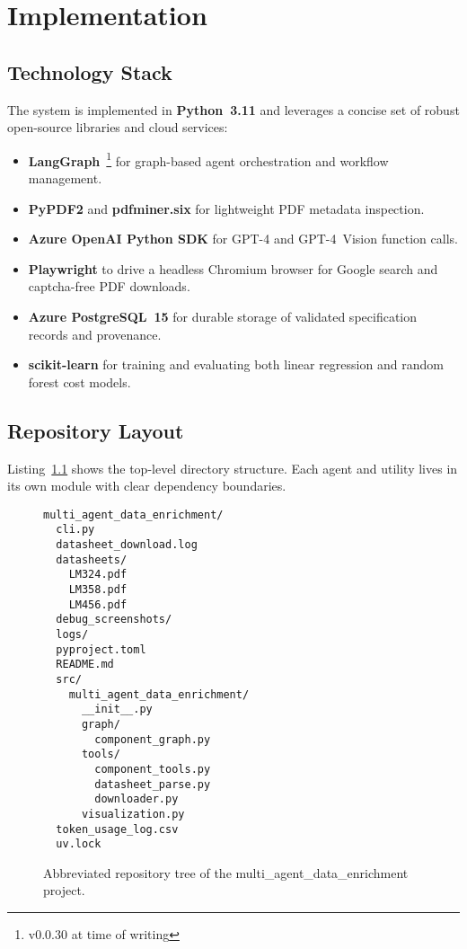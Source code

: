 \chapter{Implementation}
\label{chapter:implementation}

\section{Technology Stack}
The system is implemented in \textbf{Python~3.11} and leverages a concise set of robust open-source libraries and cloud services:
\begin{itemize}
  \item \textbf{LangGraph}~\footnote{v0.0.30 at time of writing} for graph-based agent orchestration and workflow management.
  \item \textbf{PyPDF2} and \textbf{pdfminer.six} for lightweight PDF metadata inspection.
  \item \textbf{Azure OpenAI Python SDK} for GPT-4 and GPT-4~Vision function calls.
  \item \textbf{Playwright} to drive a headless Chromium browser for Google search and captcha-free PDF downloads.
  \item \textbf{Azure PostgreSQL~15} for durable storage of validated specification records and provenance.
  \item \textbf{scikit-learn} for training and evaluating both linear regression and random forest cost models.
\end{itemize}

\section{Repository Layout}
Listing~\ref{lst:tree} shows the top-level directory structure.  Each agent and utility lives in its own module with clear dependency boundaries.
\begin{figure}[H]
\centering
\begin{minipage}{0.9\textwidth}
\begin{verbatim}
multi_agent_data_enrichment/
  cli.py
  datasheet_download.log
  datasheets/
    LM324.pdf
    LM358.pdf
    LM456.pdf
  debug_screenshots/
  logs/
  pyproject.toml
  README.md
  src/
    multi_agent_data_enrichment/
      __init__.py
      graph/
        component_graph.py
      tools/
        component_tools.py
        datasheet_parse.py
        downloader.py
      visualization.py
  token_usage_log.csv
  uv.lock
\end{verbatim}
\end{minipage}
\caption{Abbreviated repository tree of the multi\_agent\_data\_enrichment project.}
\label{lst:tree}
\end{figure}

